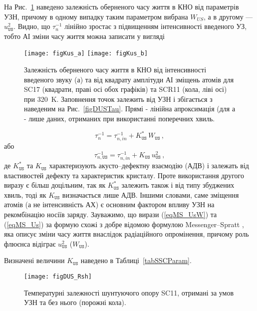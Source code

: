 На Рис.~\ref{figKus} наведено залежність оберненого часу життя в КНО від параметрів УЗН,
причому в одному випадку таким параметром вибрана $W_{U\!S}$, а в другому ---$u_\mathtt{US}^2$.
Видно, що $\tau_n^{-1}$ лінійно зростає з підвищенням інтенсивності введеного УЗ,
тобто АІ зміни часу життя можна записати у вигляді

\begin{figure}
\center
\texttt{[image: figKus\_a]} \hfill
\texttt{[image: figKus\_b]}
\caption{\label{figKus}
Залежність оберненого часу життя в КНО від інтенсивності введеного звуку (а)
та від квадрату амплітуди АІ зміщень атомів для SC17 (квадрати, праві осі обох графіків)
та SCR11 (кола, ліві осі) при 320~K.
Заповнення точок залежить від УЗН і збігається з наведеним на Рис.~\ref{figDUSTau}.
Прямі - лінійна апроксимація (для а - лише даних, отриманих при використанні поперечних хвиль.
}%
\end{figure}

\begin{equation}
\label{eqMS_UsW}
\tau_n^{-1}=\tau_{n,in}^{-1}+K_\mathtt{US}^{*}\,W_\mathtt{US}\,,
\end{equation}
або
\begin{equation}
\label{eqMS_Us}
\tau_{n,\mathtt{US}}^{-1}=\tau_{n,in}^{-1}+K_\mathtt{US}\,u_\mathtt{US}^2 \,,
\end{equation}
де $K_\mathtt{US}^{*}$ та $K_\mathtt{US}$ характеризують акусто--дефектну взаємодію (АДВ) і залежать від властивостей дефекту та характеристик кристалу.
Проте використання  другого виразу є більш доцільним, так як $K_\mathtt{US}^{*}$ залежить також і від типу збуджених хвиль,
тоді як $K_\mathtt{US}$ визначається лише АДВ.
Іншими словами, саме зміщення атомів (а не інтенсивність АХ) є основним фактором впливу УЗН на рекомбінацію носіїв заряду.
Зауважимо, що вирази (\ref{eqMS_UsW}) та (\ref{eqMS_Us}) за формую схожі з добре відомою формулою Messenger--Spratt \cite{Markvart},
яка описує зміни часу життя внаслідок радіаційного опромінення, причому роль флюєнса відіграє $u_\mathtt{US}^2$ ($W_\mathtt{US}$).

Визначені величини $K_\mathtt{US}$ наведено в Таблиці~\ref{tabSSCParam}.

\begin{figure}
\center
\texttt{[image: figDUS\_Rsh]}%
\caption{\label{figDUS_Rsh}
Температурні залежності шунтуючого опору SC11, отримані за умов УЗН та без нього (порожні кола).
}%
\end{figure}

